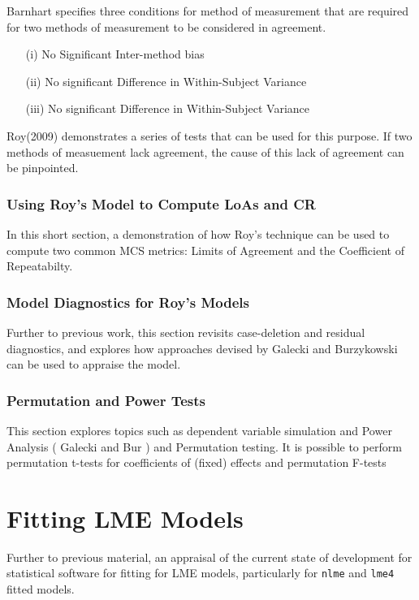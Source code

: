 \documentclass[Main.tex]{subfiles}
\begin{document}
Barnhart specifies three conditions for method of measurement that are required for two methods of measurement to be considered in agreement.

\begin{itemize}
\item[(i)] No Significant Inter-method bias
\item[(ii)] No significant Difference in Within-Subject Variance
\item[(iii)] No significant Difference in Within-Subject Variance 
\end{itemize}
  

Roy(2009) demonstrates a series of tests that can be used for this purpose. If two methods of measuement lack agreement, the cause of this lack of agreement can be pinpointed.

\subsection*{Using Roy's Model to Compute LoAs and CR }

In this short section, a demonstration of how Roy's technique can be used to compute two common MCS metrics: Limits of Agreement and the Coefficient of Repeatabilty.

\subsection*{Model Diagnostics for Roy's Models}

Further to previous work, this section revisits case-deletion and residual diagnostics, and explores how approaches devised by Galecki and Burzykowski can be used to appraise the model.

\subsection*{Permutation and Power Tests }

This section explores topics such as dependent variable simulation and Power Analysis ( Galecki and Bur ) and Permutation testing.
It is possible to perform permutation t-tests for coefficients of (fixed) effects and permutation F-tests


	
\chapter{Fitting LME Models}
Further to previous material, an appraisal of the current state of development for statistical software for fitting for LME models, particularly for \texttt{nlme} and \texttt{lme4} fitted models.
\end{document}
